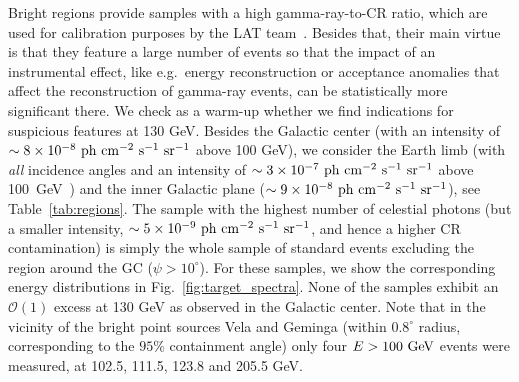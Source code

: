 \documentclass[aps,twocolumn,prd,superscriptaddress,showpacs,nofootinbib,fixfloat]{revtex4}
\newcommand{\s}{{\rm ~s}}
\newcommand{\cm}{{\rm ~cm}}
\newcommand{\ph}{{\rm ~ph}}
\newcommand{\sr}{{\rm ~sr}}
\newcommand{\GeV}{{\rm ~GeV}}
\begin{document}
Bright regions provide samples with a high gamma-ray-to-CR ratio,
which are used for calibration purposes by the LAT team~\cite{collaboration:2012kca}.
Besides that, their main virtue is that they feature a large number of events so
that the impact of an instrumental effect, like e.g.~energy
reconstruction or acceptance anomalies that affect the reconstruction of
gamma-ray events, can be statistically more
significant there. 
We check as a warm-up whether we find indications for
suspicious features at 130 GeV.
Besides the Galactic center (with an intensity of $\sim 8\times10^{-8}
\ph\cm^{-2}\s^{-1}\sr^{-1}$ above 100 GeV), we consider the
Earth limb (with \emph{all} incidence angles and an intensity of $\sim3\times10^{-7}
\ph \cm^{-2}\s^{-1}\sr^{-1}$ above 100~GeV~\cite{FermiLimb}) and the inner
Galactic plane
($\sim9\times10^{-8}\ph\cm^{-2}\s^{-1}\sr^{-1}$), see
Table~\ref{tab:regions}. 
The sample with the highest number of celestial photons 
(but a smaller intensity, $\sim5\times10^{-9}\ph\cm^{-2}\s^{-1}\sr^{-1}$, and hence
a higher CR contamination) is
simply the whole sample of
standard events excluding the region around the GC
($\psi>10^\circ$).
For these samples, we show the corresponding energy
distributions in Fig.~\ref{fig:target_spectra}. None of the
samples exhibit an $\mathcal{O}(1)$ excess at 130 GeV as
observed in the Galactic center. Note that in the vicinity
of the bright point sources Vela and Geminga (within
$0.8^\circ$ radius, corresponding to the $95\%$ containment angle) 
only four $E>100\GeV$ events were measured, at
102.5, 111.5, 123.8 and 205.5 GeV.
\medskip
\end{document}
